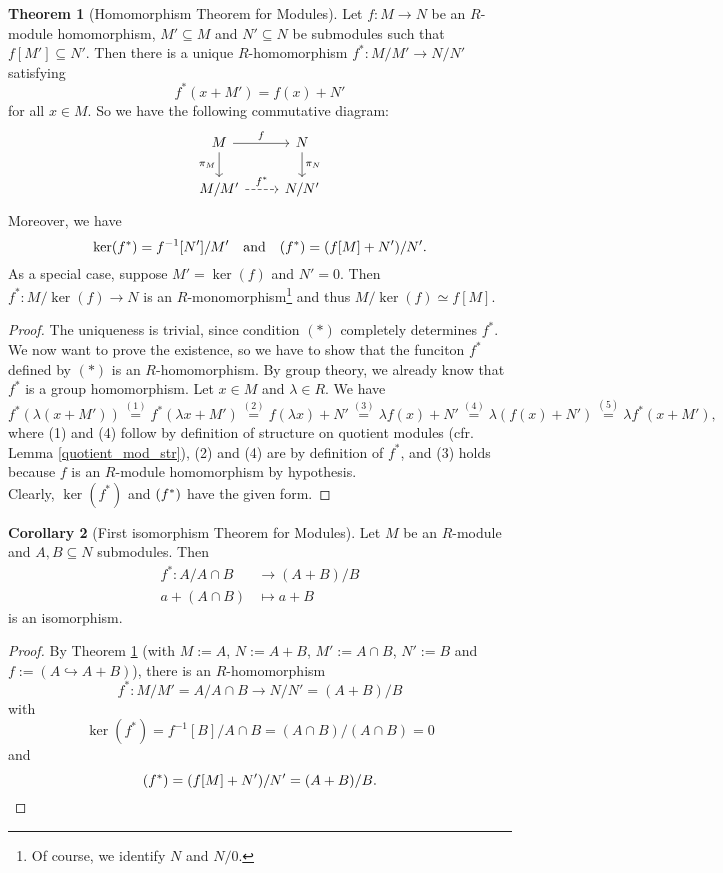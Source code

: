 \documentclass[12pt,a4paper]{report}
\theoremstyle{definition}
\newtheorem{theorem}{Theorem}[chapter] %
\newtheorem{corollary}[theorem]{Corollary} %
\theoremstyle{num.custom-title}
\let\o\relax %
\DeclareMathOperator{\o}{\mathsf{o}}
\let\Im\relax %
\DeclareMathOperator{\Im}{Im}
\DeclareMathOperator{\sse}{\subseteq}
\begin{document}
\begin{theorem}[Homomorphism Theorem for Modules]\label{mod-hom-thm}
Let $f: M \to N$ be an $R$-module homomorphism, $M' \sse M$ and $N' \sse N$ be submodules such that $f[M'] \sse N'$. Then there is a unique $R$-homomorphism  $f^*: M/M' \to N/N'$ satisfying 
\[
f^*(x+M') = f(x)+N' \tag{$*$}
\]
for all $x \in M$. So we have the following commutative diagram:
\[
\begin{tikzcd}
M \arrow{r}{f} \arrow[swap]{d}{\pi_M} & N \arrow{d}{\pi_N} \\
M/M' \arrow[dashrightarrow]{r}{f^*} & N/N' 
\end{tikzcd} 
\]
Moreover, we have
\[
\ker(f^*) = f^{-1}[N']/M' \quad \text{and} \quad \Im(f^*) = (f[M]+N')/N'.
\]
As a special case, suppose $M'=\ker(f)$ and $N'=0$. Then $f^*: M/\ker(f) \to N$ is an $R$-monomorphism\footnote{Of course, we identify $N$ and $N/0$.} and thus $M/\ker(f) \simeq f[M]$.
\begin{proof}
The uniqueness is trivial, since condition $(*)$ completely determines $f^*$.\\
We now want to prove the existence, so we have to show that the funciton $f^*$ defined by $(*)$ is an $R$-homomorphism. By group theory, we already know that $f^*$ is a group homomorphism. Let $x \in M$ and $\lambda \in R$. We have
\[
f^*(\lambda(x+M')) \stackrel{(1)}{=} f^*(\lambda x+M') \stackrel{(2)}{=} f(\lambda x)+N' \stackrel{(3)}{=} \lambda f(x)+N' \stackrel{(4)}{=} \lambda(f(x)+N') \stackrel{(5)}{=} \lambda f^*(x+M'),
\]
where (1) and (4) follow by definition of structure on quotient modules (cfr. Lemma \ref{quotient_mod_str}), (2) and (4) are by definition of $f^*$, and (3) holds because $f$ is an $R$-module homomorphism by hypothesis.\\
Clearly, $\ker(f^*)$ and $\Im(f^*)$ have the given form.
\end{proof}
\end{theorem}

\begin{corollary}[First isomorphism Theorem for Modules]\label{1-iso-thm}
Let $M$ be an $R$-module and $A,B \sse N$ submodules. Then
\begin{align*}
f^* \colon A/A \cap B &\to (A+B)/B \\
a+ (A \cap B) &\mapsto a+B
\end{align*}
is an isomorphism.
\begin{proof}
By Theorem \ref{mod-hom-thm} (with $M:=A$, $N:=A+B$, $M':=A \cap B$, $N':=B$ and $f := (A \hookrightarrow A+B)$), there is an $R$-homomorphism
\[
f^* \colon M/M' = A/A \cap B \to N/N' = (A+B)/B
\]
with
\[
\ker(f^*) = f^{-1}[B]/A \cap B = (A \cap B) / (A \cap B) = 0
\]
and
\[
\Im(f^*) = (f[M]+N')/N' = (A+B)/B.
\]
\end{proof}
\end{corollary}
\end{document}
